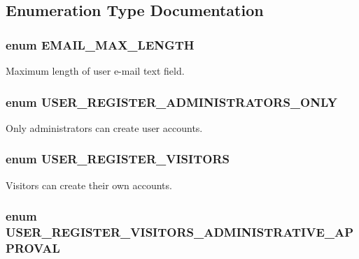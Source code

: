 \subsection{Enumeration Type Documentation}
\hypertarget{user_8module_ace0e892f6bacb71d3660bc875ce80a96}{
\subsubsection[{EMAIL\_\-MAX\_\-LENGTH}]{\setlength{\rightskip}{0pt plus 5cm}enum {\bf EMAIL\_\-MAX\_\-LENGTH}}}
\label{user_8module_ace0e892f6bacb71d3660bc875ce80a96}
Maximum length of user e-\/mail text field. \hypertarget{user_8module_a86e7d065e288fde0300970e27f3f9438}{
\subsubsection[{USER\_\-REGISTER\_\-ADMINISTRATORS\_\-ONLY}]{\setlength{\rightskip}{0pt plus 5cm}enum {\bf USER\_\-REGISTER\_\-ADMINISTRATORS\_\-ONLY}}}
\label{user_8module_a86e7d065e288fde0300970e27f3f9438}
Only administrators can create user accounts. \hypertarget{user_8module_aad1e83ffc252c482267461bde962d19f}{
\subsubsection[{USER\_\-REGISTER\_\-VISITORS}]{\setlength{\rightskip}{0pt plus 5cm}enum {\bf USER\_\-REGISTER\_\-VISITORS}}}
\label{user_8module_aad1e83ffc252c482267461bde962d19f}
Visitors can create their own accounts. \hypertarget{user_8module_a46063390f086e98c8db7e380c0fa1fd5}{
\subsubsection[{USER\_\-REGISTER\_\-VISITORS\_\-ADMINISTRATIVE\_\-APPROVAL}]{\setlength{\rightskip}{0pt plus 5cm}enum {\bf USER\_\-REGISTER\_\-VISITORS\_\-ADMINISTRATIVE\_\-APPROVAL}}}
